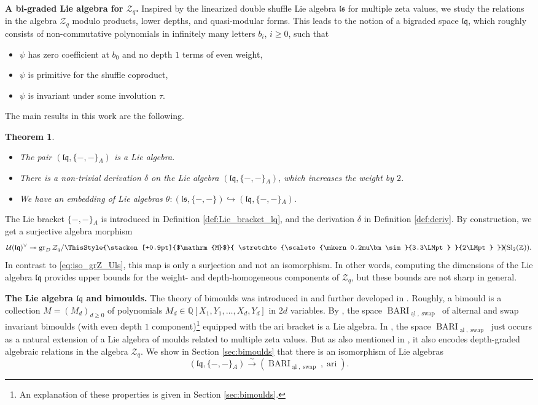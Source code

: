 \documentclass[12pt,reqno]{amsart}
\newtheorem{thm}{Theorem}[section]
\numberwithin{equation}{section}
\theoremstyle{definition}
\newcommand{\medtildeM}{ \ThisStyle{\stackon[+0.9pt]{$\mathrm{M}$}{ \stretchto{\scaleto{\mkern0.2mu\bm\sim}{3.3\LMpt} }{2\LMpt} }}}
\newcommand{\ZZ}{\mathbb{Z}}
\newcommand{\QQ}{\mathbb{Q}}
\newcommand{\quasimod}{\ensuremath{\medtildeM\!(\operatorname{Sl}_2(\ZZ))}}
\newcommand{\Z}{\mathcal{Z}}
\newcommand{\grDZ}{\operatorname{gr}_D\Z}
\newcommand{\BARI}{\operatorname{BARI}_{\underline{\operatorname{al}},\operatorname{swap}}}
\newcommand{\ls}{\mathfrak{ls}}
\newcommand{\lqq}{\mathfrak{lq}}
\newcommand{\ariemp}{\{-,-\}\!_A}
\begin{document}
\vspace{0,3cm}
\textbf{A bi-graded Lie algebra for $\Z_q$.}  Inspired by the linearized double shuffle Lie algebra $\ls$ for multiple zeta values, we study the relations in the algebra $\Z_q$ modulo products, lower depths, and quasi-modular forms. This leads to the notion of a bigraded space $\lqq$, which roughly consists of non-commutative polynomials in infinitely many letters $b_i$, $i\geq0$, such that
\begin{itemize}
\item[(i)] $\psi$ has zero coefficient at $b_0$ and no depth $1$ terms of even weight,
\item[(ii)] $\psi$ is primitive for the shuffle coproduct,
\item[(iii)] $\psi$ is invariant under some involution $\tau$.
\end{itemize}
The main results in this work are the following.
\begin{thm} \label{main_thm} 
\begin{itemize}  \setlength\itemsep{0.8em}
\item[(1)] The pair $(\lqq,\ariemp)$ is a Lie algebra.
\item[(2)] There is a non-trivial derivation $\delta$ on the Lie algebra $(\lqq,\ariemp)$, which increases the weight by $2$.
\item[(3)] We have an embedding of Lie algebras
$\theta: (\ls,\{-,-\})\hookrightarrow (\lqq,\ariemp)$.
\end{itemize}
\end{thm}
The Lie bracket $\ariemp$ is introduced in Definition \ref{def:Lie_bracket_lq}, and the derivation $\delta$ in Definition \ref{def:deriv}. By construction, we get a surjective algebra morphism
\begin{align} \label{eq:iso_grZq_Ulq}
\mathcal{U}(\lqq)^\vee \twoheadrightarrow\grDZ_q/\quasimod.
\end{align}
In contrast to \eqref{eq:iso_grZ_Uls}, this map is only a surjection and not an isomorphism. In other words, computing the dimensions of the Lie algebra $\lqq$ provides upper bounds for the weight- and depth-homogeneous components of $\Z_q$, but these bounds are not sharp in general.

\vspace{0,3cm}
\textbf{The Lie algebra $\lqq$ and bimoulds.} The theory of bimoulds was introduced in \cite{Ec11} and further developed in \cite{Sc15}. Roughly, a bimould is a collection $M=(M_d)_{d\geq0}$ of polynomials $M_d\in\QQ[X_1,Y_1,\ldots,X_d,Y_d]$ in $2d$ variables. By \cite{Sc15}, the space $\BARI$ of alternal and swap invariant bimoulds (with even depth $1$ component)\footnote{An explanation of these properties is given in Section \ref{sec:bimoulds}.} equipped with the ari bracket is a Lie algebra. In \cite{Sc15}, the space $\BARI$ just occurs as a natural extension of a Lie algebra of moulds related to multiple zeta values. But as also mentioned in \cite{Kü19}, it also encodes depth-graded algebraic relations in the algebra $\Z_q$. We show in Section \ref{sec:bimoulds} that there is an isomorphism of Lie algebras
\[(\lqq,\ariemp)\xrightarrow{\sim}(\BARI,\operatorname{ari}).\]
\end{document}
